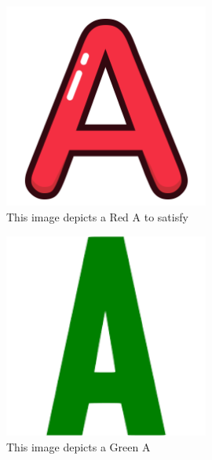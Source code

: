 \documentclass[12pt, titlepage]{article}
\begin{document}
\begin{figure}[h!]
  \begin{center}
    \includegraphics[width=0.6\textwidth]{redA}
  \caption{This image depicts a Red A to satisfy}
  \label{Fig_redA} 
  \end{center}
  \end{figure}

\begin{figure}[h!]
  \begin{center}
    \includegraphics[width=0.6\textwidth]{greenA}
  \caption{This image depicts a Green A}
  \label{Fig_greenA} 
  \end{center}
  \end{figure}
\end{document}
